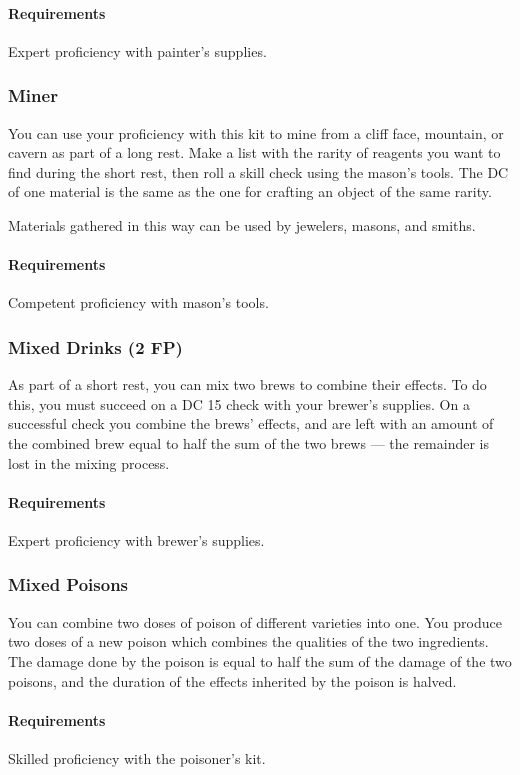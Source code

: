     \paragraph{Requirements} Expert proficiency with painter's supplies.
\subsubsection{Miner} \label{feat::miner}
    You can use your proficiency with this kit to mine from a cliff face, mountain, or cavern as part of a long rest.
    Make a list with the rarity of reagents you want to find during the short rest, then roll a skill check using the mason's tools.
    The DC of one material is the same as the one for crafting an object of the same rarity.

    Materials gathered in this way can be used by jewelers, masons, and smiths.
    \paragraph{Requirements} Competent proficiency with mason's tools.
\subsubsection{Mixed Drinks (2 FP)} \label{feat::mixeddrinks}
    As part of a short rest, you can mix two brews to combine their effects.
    To do this, you must succeed on a DC 15 check with your brewer's supplies.
    On a successful check you combine the brews' effects, and are left with an amount of the combined brew equal to half the sum of the two brews --- the remainder is lost in the mixing process.
    \paragraph{Requirements} Expert proficiency with brewer's supplies.
\subsubsection{Mixed Poisons} \label{feat::mixedpoisons}
    You can combine two doses of poison of different varieties into one.
    You produce two doses of a new poison which combines the qualities of the two ingredients.
    The damage done by the poison is equal to half the sum of the damage of the two poisons, and the duration of the effects inherited by the poison is halved.
    \paragraph{Requirements} Skilled proficiency with the poisoner's kit.
